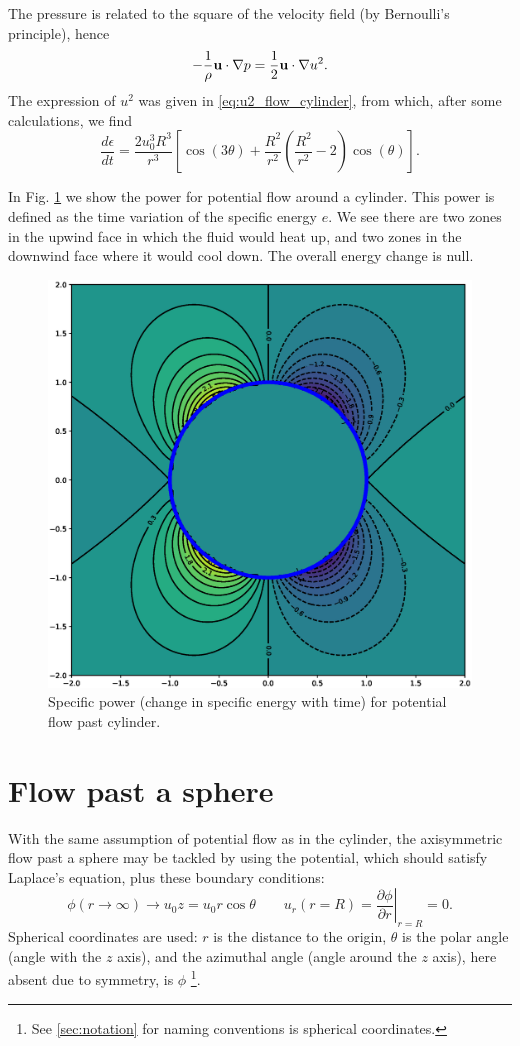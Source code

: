 The pressure is related to the square of the velocity field (by Bernoulli's principle), hence
\[
-\frac{1}{\rho} \mathbf{u} \cdot \nabla p =  \frac12 \mathbf{u} \cdot \nabla u^2 .
\]
The expression of $u^2$ was given in \eqref{eq:u2_flow_cylinder}, from
which, after some calculations, we find
\[
\frac{d \epsilon}{d t} =
\frac{2 u_0^3 R^3}{r^3}
\left[ 
\cos(3\theta) +
\frac{R^2}{r^2}
\left( \frac{R^2}{r^2} - 2 \right) \cos(\theta)
\right] .
\]

In Fig. \ref{fig:potential_flow_past_cylinder_energy} we show the power
for potential flow around a cylinder. This power is defined as the time variation
of the specific energy $e$. We see there are two zones in the upwind face in which the
fluid would heat up, and two zones in the downwind face where it would cool down. The
overall energy change is null.


\begin{figure}
	\centering
	\includegraphics[width=0.4\linewidth]{figures/potential_flow_past_cylinder_power}
	\caption{Specific power (change in specific energy with time) for potential
		flow past cylinder.  \label{fig:potential_flow_past_cylinder_energy}}
\end{figure}



\section{Flow past a sphere}

With the same assumption of potential flow as in the cylinder, the
axisymmetric flow past a sphere may be tackled by using the potential,
which should satisfy Laplace's equation, plus these boundary
conditions:
\[
  \phi (r\to \infty) \to u_0 z = u_0 r \cos\theta \qquad
  u_r(r=R) =\left. \frac{\partial \phi}{\partial r} \right|_{r=R} = 0 .
\]
Spherical coordinates  are used:
$r$ is the distance to the origin, $\theta$ is the polar angle (angle
with the $z$ axis), and the azimuthal angle (angle around the $z$
axis), here absent due to symmetry, is $\phi$ %
\footnote{See \ref{sec:notation} for naming conventions is spherical
coordinates.}.


